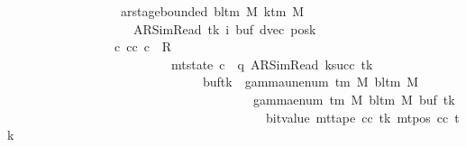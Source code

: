 \begin{isabellebody}
\ \ \ \ \ \ \ \ \ \ \ \ \ \ \ \ \ \ ar{\isacharunderscore}{\kern0pt}stage{\isacharunderscore}{\kern0pt}bounded\ {\isacharparenleft}{\kern0pt}bl{\isacharunderscore}{\kern0pt}tm\ M{\isacharparenright}{\kern0pt}\ {\isacharparenleft}{\kern0pt}k{\isacharunderscore}{\kern0pt}tm\ M{\isacharparenright}{\kern0pt}\isanewline
\ \ \ \ \ \ \ \ \ \ \ \ \ \ \ \ \ \ \ \ {\isacharparenleft}{\kern0pt}AR{\isacharunderscore}{\kern0pt}SimRead{\isacharcomma}{\kern0pt}\ tk{\isacharcomma}{\kern0pt}\ i{\isacharcomma}{\kern0pt}\ buf{\isacharprime}{\kern0pt}{\isacharcomma}{\kern0pt}\ dvec{\isacharcomma}{\kern0pt}\ posk{\isacharprime}{\kern0pt}{\isacharparenright}{\kern0pt}\ {\isasymrbrakk}\isanewline
\ \ \ \ \ \ \ \ \ \ \ \ \ \ \ \ {\isasymLongrightarrow}\ {\isasymexists}c{\isacharprime}{\kern0pt}{\isacharprime}{\kern0pt}{\isachardot}{\kern0pt}\ {\isacharparenleft}{\kern0pt}cc{\isacharcomma}{\kern0pt}\ c{\isacharprime}{\kern0pt}{\isacharprime}{\kern0pt}{\isacharparenright}{\kern0pt}\ {\isasymin}\ R{\isacharprime}{\kern0pt}\isanewline
\ \ \ \ \ \ \ \ \ \ \ \ \ \ \ \ \ \ \ \ \ \ \ \ \ {\isasymand}\ mt{\isacharunderscore}{\kern0pt}state\ c{\isacharprime}{\kern0pt}{\isacharprime}{\kern0pt}\ {\isacharequal}{\kern0pt}\ {\isacharparenleft}{\kern0pt}q{\isacharcomma}{\kern0pt}\ AR{\isacharunderscore}{\kern0pt}SimRead{\isacharcomma}{\kern0pt}\ k{\isacharunderscore}{\kern0pt}succ\ tk{\isacharcomma}{\kern0pt}\ {}{\isacharcomma}{\kern0pt}\isanewline
\ \ \ \ \ \ \ \ \ \ \ \ \ \ \ \ \ \ \ \ \ \ \ \ \ \ \ \ \ \ \ buf{\isacharprime}{\kern0pt}{\isacharparenleft}{\kern0pt}tk\ {\isacharcolon}{\kern0pt}{\isacharequal}{\kern0pt}\ gamma{\isacharunderscore}{\kern0pt}unenum\ {\isacharparenleft}{\kern0pt}{\isasymGamma}{\isacharunderscore}{\kern0pt}tm\ M{\isacharparenright}{\kern0pt}\ {\isacharparenleft}{\kern0pt}bl{\isacharunderscore}{\kern0pt}tm\ M{\isacharparenright}{\kern0pt}\isanewline
\ \ \ \ \ \ \ \ \ \ \ \ \ \ \ \ \ \ \ \ \ \ \ \ \ \ \ \ \ \ \ \ \ \ \ \ \ {\isacharparenleft}{\kern0pt}{}\ {\isacharasterisk}{\kern0pt}\ gamma{\isacharunderscore}{\kern0pt}enum\ {\isacharparenleft}{\kern0pt}{\isasymGamma}{\isacharunderscore}{\kern0pt}tm\ M{\isacharparenright}{\kern0pt}\ {\isacharparenleft}{\kern0pt}bl{\isacharunderscore}{\kern0pt}tm\ M{\isacharparenright}{\kern0pt}\ {\isacharparenleft}{\kern0pt}buf{\isacharprime}{\kern0pt}\ tk{\isacharparenright}{\kern0pt}\isanewline
\ \ \ \ \ \ \ \ \ \ \ \ \ \ \ \ \ \ \ \ \ \ \ \ \ \ \ \ \ \ \ \ \ \ \ \ \ \ \ \ {\isacharplus}{\kern0pt}\ bit{\isacharunderscore}{\kern0pt}value\ {\isacharparenleft}{\kern0pt}mt{\isacharunderscore}{\kern0pt}tape\ cc\ tk\ {\isacharparenleft}{\kern0pt}mt{\isacharunderscore}{\kern0pt}pos\ cc\ tk{\isacharparenright}{\kern0pt}{\isacharparenright}{\kern0pt}{\isacharparenright}{\kern0pt}{\isacharparenright}{\kern0pt}{\isacharcomma}{\kern0pt}\isanewline

\end{isabellebody}
